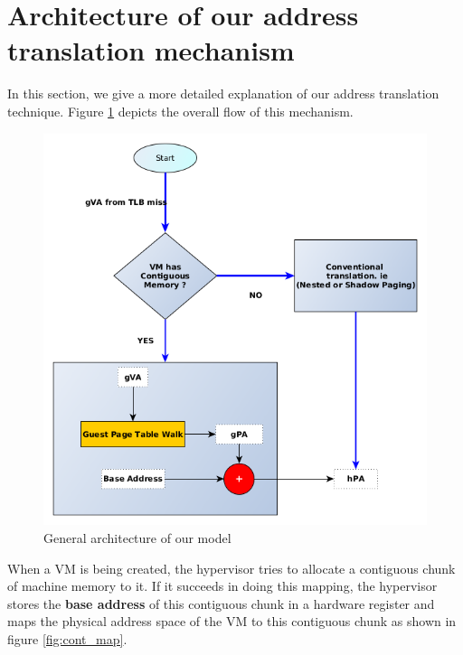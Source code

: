 \documentclass[sigconf]{sigplanconf}
\begin{document}
        \section{Architecture of our address translation mechanism}
       In this section, we give a more detailed explanation of our address translation technique.
       Figure \ref{fig:model_arch} depicts the overall flow of this mechanism. 
       
       \begin{figure}[!h]
       	\centering
       	\includegraphics[scale=0.35]{meca_arch.png}
       	\caption{General architecture of our model}
       	\label{fig:model_arch}
       \end{figure}
       
       When a VM is being created, the hypervisor tries to allocate a contiguous chunk of machine memory to it. If it succeeds in doing this mapping, the hypervisor stores the \textbf{base address} of this contiguous chunk in a hardware register and maps the physical address space of the VM to this contiguous chunk as shown in figure 
       \ref{fig:cont_map}.
        
\end{document}
